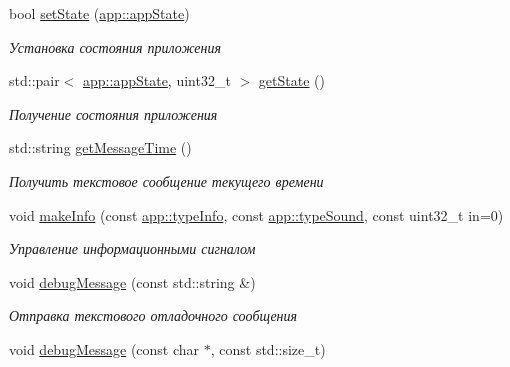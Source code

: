 \begin{DoxyCompactItemize}
bool \hyperlink{classapp_1_1_t_application_a3df1835103a3ba338821c27ad05f9f8d}{set\+State} (\hyperlink{group___xD0_x9F_xD0_xB5_xD1_x80_xD0_xB5_xD1_x87_xD0_xB8_xD1_x81_xD0_xBB_xD0_xB5_xD0_xBD_xD0_xB8_xD1_x8F_ga290e8080c661e52c2f685fd4af148acf}{app\+::app\+State})
\begin{DoxyCompactList}\small\item\em Установка состояния приложения \end{DoxyCompactList}\item 
std\+::pair$<$ \hyperlink{group___xD0_x9F_xD0_xB5_xD1_x80_xD0_xB5_xD1_x87_xD0_xB8_xD1_x81_xD0_xBB_xD0_xB5_xD0_xBD_xD0_xB8_xD1_x8F_ga290e8080c661e52c2f685fd4af148acf}{app\+::app\+State}, uint32\+\_\+t $>$ \hyperlink{classapp_1_1_t_application_a254728135b699d84f82a334708b1fbda}{get\+State} ()
\begin{DoxyCompactList}\small\item\em Получение состояния приложения \end{DoxyCompactList}\item 
std\+::string \hyperlink{classapp_1_1_t_application_aa2cb4a923a937f1a47a28fb5efe3b943}{get\+Message\+Time} ()
\begin{DoxyCompactList}\small\item\em Получить текстовое сообщение текущего времени \end{DoxyCompactList}\item 
void \hyperlink{classapp_1_1_t_application_a1d5d4282bfbee6c984b10394f50a6cab}{make\+Info} (const \hyperlink{group___xD0_x9F_xD0_xB5_xD1_x80_xD0_xB5_xD1_x87_xD0_xB8_xD1_x81_xD0_xBB_xD0_xB5_xD0_xBD_xD0_xB8_xD1_x8F_gaf2797b8ed91d66a25b1b3b05ea7bcfc2}{app\+::type\+Info}, const \hyperlink{group___xD0_x9F_xD0_xB5_xD1_x80_xD0_xB5_xD1_x87_xD0_xB8_xD1_x81_xD0_xBB_xD0_xB5_xD0_xBD_xD0_xB8_xD1_x8F_ga33d8f1a04a907b6c65c5dfc88280ac6f}{app\+::type\+Sound}, const uint32\+\_\+t in=0)
\begin{DoxyCompactList}\small\item\em Управление информационными сигналом \end{DoxyCompactList}\item 
void \hyperlink{classapp_1_1_t_application_abec229b87538c5db318ef57f25f6e84d}{debug\+Message} (const std\+::string \&)
\begin{DoxyCompactList}\small\item\em Отправка текстового отладочного сообщения \end{DoxyCompactList}\item 
void \hyperlink{classapp_1_1_t_application_ac0c8e394021c1d1ab4163bc8bd8f7b42}{debug\+Message} (const char $\ast$, const std\+::size\+\_\+t)

\end{DoxyCompactItemize}
